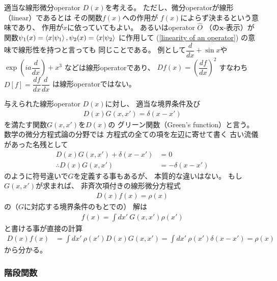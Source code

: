 適当な線形微分operator $D(x)$を考える。
ただし、微分operatorが線形（linear）であるとは
その関数$f(x)$への作用が
$f(x)$によらず決まるという意味であり、
作用が$x$に依っていてもよい。
あるいはoperator $\hat{O}$
（の$\bm{x}$-表示）が
関数$\psi_1(x) = \braket{x | \psi_1},
\psi_2(x) = \braket{x | \psi_2}$
に作用して
(\ref{linearity of an operator})
の意味で線形性を持つと言っても
同じことである。
例として$\dfrac{d}{dx} + \sin x$や
$\exp( i a \dfrac{d}{dx}) + x^3$
などは線形operatorであり、
$D f(x) = \left(
    \dfrac{d f}{dx}
\right)^2$
すなわち$D[f] = \dfrac{d f}{dx}
    \dfrac{d}{dx}$
は線形operatorではない。

与えられた線形operator $D(x)$に対し、
適当な境界条件及び
\begin{align}
    D(x) G(x, x')
    =
    \delta(x - x')
\end{align}
を満たす関数$G(x, x')$を$D(x)$の
グリーン関数（Green's function）と言う。
数学の微分方程式論の分野では
方程式の全ての項を左辺に寄せて書く
古い流儀があった名残として
\begin{align*}
    D(x) G(x, x')
    +
    \delta(x - x')
&=
    0
\\\therefore
    D(x) G(x, x')
&=
    -
    \delta(x - x')
\end{align*}
のように符号違いで$G$を定義する事もあるが、
本質的な違いはない。
もし$G(x, x')$が求まれば、
非斉次項付きの線形微分方程式
\begin{align}
    D(x) f(x)
    =
    \rho(x)
\end{align}
の（$G$に対応する境界条件のもとでの）
解は
\begin{align}
    f(x) =
    \int dx'\ 
        G(x, x')
        \rho(x')
\end{align}
と書ける事が直接の計算
\begin{align}
    D(x) f(x)
&=
    \int dx'\ 
        \rho(x')
    D(x)
        G(x, x')
=
    \int dx'\ 
        \rho(x')
    \delta (x - x')
=
    \rho(x)
\end{align}
から分かる。

\subsubsection{階段関数}

